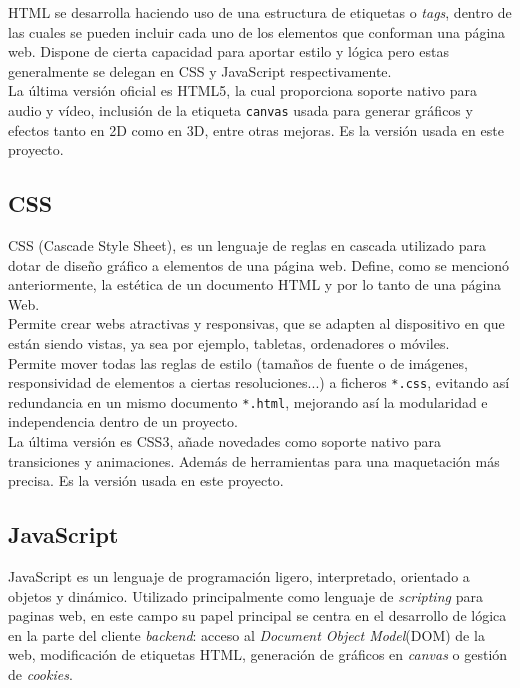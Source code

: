 \documentclass[a4paper, 12pt]{book}
\begin{document}
		HTML se desarrolla haciendo uso de una estructura de etiquetas o \textit{tags}, dentro de las cuales se pueden incluir cada uno de los elementos que conforman una página web. Dispone de cierta capacidad para aportar estilo y lógica pero estas generalmente se delegan en CSS y JavaScript respectivamente.\\
		
		La última versión oficial es HTML5, la cual proporciona soporte nativo para audio y vídeo, inclusión de la etiqueta \texttt{canvas} usada para generar gráficos y efectos tanto en 2D como en 3D, entre otras mejoras. Es la versión usada en este proyecto.
		
	\subsection{CSS}
	\label{subsec:css}
		CSS (Cascade Style Sheet), es un lenguaje de reglas en cascada utilizado para dotar de diseño gráfico a elementos de una página web. Define, como se mencionó anteriormente, la estética de un documento HTML y por lo tanto de una página Web. \\
		
		Permite crear webs atractivas y responsivas, que se adapten al dispositivo en que están siendo vistas, ya sea por ejemplo, tabletas, ordenadores o móviles.\\
		
		Permite mover todas las reglas de estilo (tamaños de fuente o de imágenes, responsividad de elementos a ciertas resoluciones...) a ficheros \texttt{*.css}, evitando así redundancia en un mismo documento \texttt{*.html}, mejorando así la modularidad e independencia dentro de un proyecto.\\
		
		La última versión es CSS3, añade novedades como soporte nativo para transiciones y animaciones. Además de herramientas para una maquetación más precisa. Es la versión usada en este proyecto.
		
	\subsection{JavaScript}
	\label{subsec:javascript}
		JavaScript \cite{JavaScript} es un lenguaje de programación ligero, interpretado, orientado a objetos y dinámico. Utilizado principalmente como lenguaje de \textit{scripting} para paginas web, en este campo su papel principal se centra en el desarrollo de lógica en la parte del cliente \textit{backend}: acceso al \textit{Document Object Model}(DOM) de la web, modificación de etiquetas HTML, generación de gráficos en \textit{canvas} o gestión de \textit{cookies}. \\
		
\end{document}
